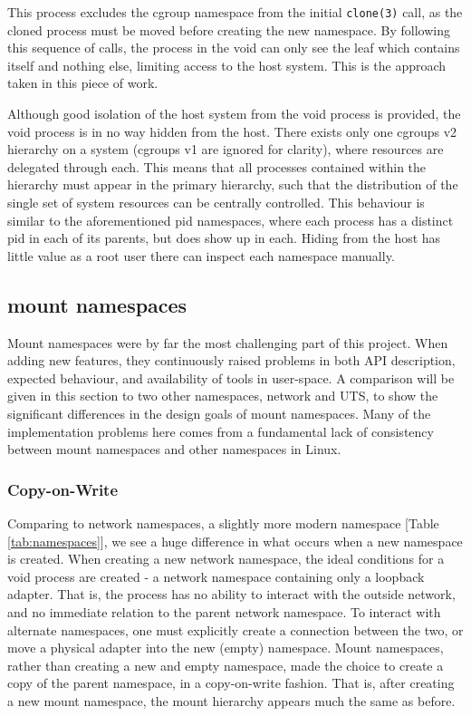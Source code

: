 \documentclass[sigplan]{acmart}
\begin{document}
This process excludes the cgroup namespace from the initial \texttt{clone(3)} call, as the cloned process must be moved before creating the new namespace. By following this sequence of calls, the process in the void can only see the leaf which contains itself and nothing else, limiting access to the host system.  This is the approach taken in this piece of work.

Although good isolation of the host system from the void process is provided, the void process is in no way hidden from the host. There exists only one cgroups v2 hierarchy on a system (cgroups v1 are ignored for clarity), where resources are delegated through each. This means that all processes contained within the hierarchy must appear in the primary hierarchy, such that the distribution of the single set of system resources can be centrally controlled. This behaviour is similar to the aforementioned pid namespaces, where each process has a distinct pid in each of its parents, but does show up in each. Hiding from the host has little value as a root user there can inspect each namespace manually.

\subsection{mount namespaces}

Mount namespaces were by far the most challenging part of this project. When adding new features, they continuously raised problems in both API description, expected behaviour, and availability of tools in user-space. A comparison will be given in this section to two other namespaces, network and UTS, to show the significant differences in the design goals of mount namespaces. Many of the implementation problems here comes from a fundamental lack of consistency between mount namespaces and other namespaces in Linux.

\subsubsection{Copy-on-Write}

Comparing to network namespaces, a slightly more modern namespace [Table \ref{tab:namespaces}], we see a huge difference in what occurs when a new namespace is created. When creating a new network namespace, the ideal conditions for a void process are created - a network namespace containing only a loopback adapter. That is, the process has no ability to interact with the outside network, and no immediate relation to the parent network namespace. To interact with alternate namespaces, one must explicitly create a connection between the two, or move a physical adapter into the new (empty) namespace. Mount namespaces, rather than creating a new and empty namespace, made the choice to create a copy of the parent namespace, in a copy-on-write fashion. That is, after creating a new mount namespace, the mount hierarchy appears much the same as before.
\end{document}
